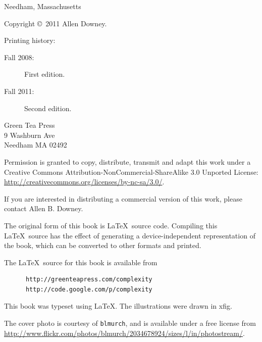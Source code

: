 \documentclass[10pt]{book}
\begin{document}
\begin{latexonly}
\begin{flushright}
{\small Needham, Massachusetts}

\vfill

\end{flushright}


\pagebreak
\thispagestyle{empty}

{\small
Copyright \copyright ~2011 Allen Downey.


Printing history:

\begin{description}

\item[Fall 2008:] First edition.

\item[Fall 2011:] Second edition.

\end{description}

\vspace{0.2in}

\begin{flushleft}
Green Tea Press       \\
9 Washburn Ave \\
Needham MA 02492
\end{flushleft}

Permission is granted to copy, distribute, transmit and adapt
this work under a Creative Commons
Attribution-NonCommercial-ShareAlike 3.0 Unported License:
\url{http://creativecommons.org/licenses/by-nc-sa/3.0/}.

If you are interested in distributing a commercial version of this
work, please contact Allen B. Downey.

The original form of this book is \LaTeX\ source code.  Compiling this
\LaTeX\ source has the effect of generating a device-independent
representation of the book, which can be converted to other formats
and printed.

The \LaTeX\ source for this book is available from

\begin{verbatim}
      http://greenteapress.com/complexity
      http://code.google.com/p/complexity
\end{verbatim}

This book was typeset using \LaTeX .  The illustrations were
drawn in xfig.

The cover photo is courtesy of {\tt blmurch}, and is available
under a free license from
\url{http://www.flickr.com/photos/blmurch/2034678924/sizes/l/in/photostream/}.

\vspace{0.2in}

} %

\end{latexonly}
\end{document}
